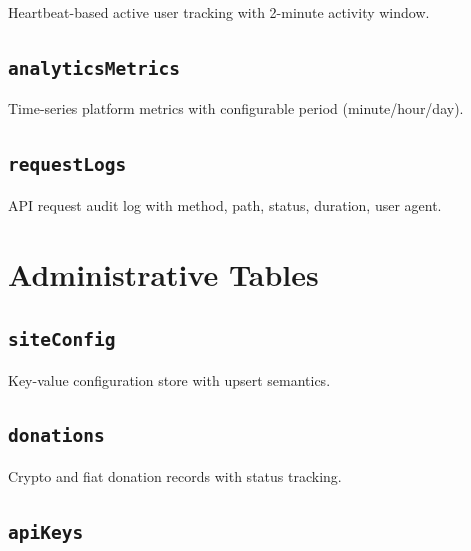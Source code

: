 Heartbeat-based active user tracking with 2-minute activity window.

\subsection{\texttt{analyticsMetrics}}

Time-series platform metrics with configurable period (minute/hour/day).

\subsection{\texttt{requestLogs}}

API request audit log with method, path, status, duration, user agent.

\section{Administrative Tables}
\label{sec:schema:admin}

\subsection{\texttt{siteConfig}}

Key-value configuration store with upsert semantics.

\subsection{\texttt{donations}}

Crypto and fiat donation records with status tracking.

\subsection{\texttt{apiKeys}}

